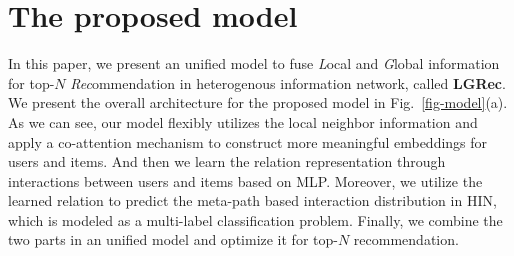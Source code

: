\section{The proposed model}
In this paper, we present an unified model to fuse \emph{L}ocal and \emph{G}lobal information for top-$N$ \emph{Rec}ommendation in heterogenous information network, called \textbf{LGRec}. We present the overall architecture for the proposed model in Fig.~\ref{fig-model}(a). As we can see, our model flexibly utilizes the local neighbor information and apply a co-attention mechanism to construct more meaningful embeddings for users and items. And then we learn the relation representation through interactions between users and items based on MLP. Moreover, we utilize the learned relation to predict the meta-path based interaction distribution in HIN, which is modeled as a multi-label classification problem. Finally, we combine the two parts in an unified model and optimize it for top-$N$ recommendation.





